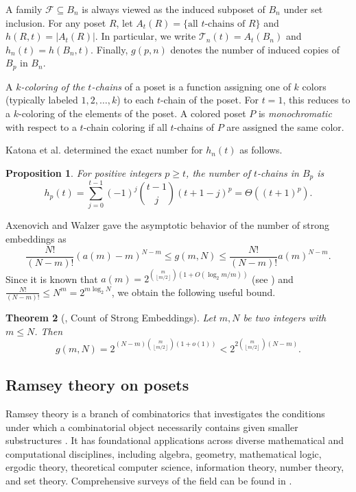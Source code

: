 \documentclass[twoside,12pt]{article}
\newtheorem{theorem}{Theorem}[section]
\newtheorem{proposition}[theorem]{Proposition}
\begin{document}
A family $\mathcal F\subseteq B_n$ is always viewed as the induced subposet of $B_n$ under set inclusion. For any poset $R$, let
$A_t(R)=\{\text{all }t\text{-chains of }R\}$ and $h(R,t)=|A_t(R)|$.
In particular, we write
$\mathcal T_n(t)=A_t(B_n)$ and $h_n(t)=h(B_n,t).$
Finally, $g(p,n)$ denotes the number of induced copies of $B_p$ in $B_n$.


A \emph{$k$-coloring of the $t$-chains} of a poset is a function assigning one of $k$ colors (typically labeled $1, 2, \dots, k$) to each $t$-chain of the poset. For $t = 1$, this reduces to a $k$-coloring of the elements of the poset.
A colored poset $P$ is \emph{monochromatic} with respect to a $t$-chain coloring if all $t$-chains of $P$ are assigned the same color.

Katona et al. \cite{KMOW25} determined the exact number for $h_n(t)$ as follows.
\begin{proposition}{\upshape \cite{KMOW25}}\label{th-La2}
For positive integers \(p \geq t\), the number of \(t\)-chains in \(B_p\) is
\begin{equation*}
h_p(t)=\sum_{j=0}^{t-1}(-1)^j\binom{t-1}{j}(t+1-j)^p = \Theta((t + 1)^p).
\end{equation*}
\end{proposition}

Axenovich and Walzer \cite{AW17} gave the asymptotic behavior of the number of strong embeddings as
$$
\frac{N !}{(N-m) !}(a(m)-m)^{N-m} \leq g(m, N) \leq \frac{N !}{(N-m) !} a(m)^{N-m}.
$$
Since it is known that $a(m)=2^{{m\choose \left\lfloor m/2\right\rfloor}(1+O(\log_2 m/m))}$
(see \cite{KM}) and $\frac{N !}{(N-m) !}\leq N^m=2^{m\log_2 N}$,
we obtain the following useful bound.
\begin{theorem}[\cite{AW17}, Count of Strong Embeddings]\label{number_b_n}
Let $m,N$ be two integers with $m \leq N$.
Then
$$
g(m, N) = 2^{(N-m){m\choose \left\lfloor m/2\right\rfloor}(1+o(1))}
<
2^{2{m\choose \left\lfloor m/2\right\rfloor}(N-m)}.
$$
\end{theorem}
\subsection{Ramsey theory on posets}
Ramsey theory is a branch of combinatorics that investigates the conditions under which a combinatorial object necessarily contains given smaller substructures \cite{Ramsey30}. It has foundational applications across diverse mathematical and computational disciplines, including algebra, geometry, mathematical logic, ergodic theory, theoretical computer science, information theory, number theory, and set theory. Comprehensive surveys of the field can be found in \cite{GRS90, Rosta04}.
\end{document}

